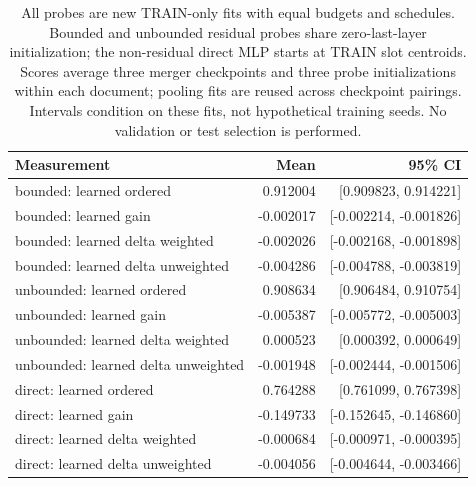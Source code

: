 \begin{table}[H]
\centering\small
\begin{tabularx}{\linewidth}{Yrr}
\toprule
Measurement & Mean & 95\% CI \\
\midrule
bounded: learned ordered & 0.912004 & [0.909823, 0.914221] \\
bounded: learned gain & -0.002017 & [-0.002214, -0.001826] \\
bounded: learned delta weighted & -0.002026 & [-0.002168, -0.001898] \\
bounded: learned delta unweighted & -0.004286 & [-0.004788, -0.003819] \\
unbounded: learned ordered & 0.908634 & [0.906484, 0.910754] \\
unbounded: learned gain & -0.005387 & [-0.005772, -0.005003] \\
unbounded: learned delta weighted & 0.000523 & [0.000392, 0.000649] \\
unbounded: learned delta unweighted & -0.001948 & [-0.002444, -0.001506] \\
direct: learned ordered & 0.764288 & [0.761099, 0.767398] \\
direct: learned gain & -0.149733 & [-0.152645, -0.146860] \\
direct: learned delta weighted & -0.000684 & [-0.000971, -0.000395] \\
direct: learned delta unweighted & -0.004056 & [-0.004644, -0.003466] \\
\bottomrule
\end{tabularx}
\caption{All probes are new TRAIN-only fits with equal budgets and schedules. Bounded and unbounded residual probes share zero-last-layer initialization; the non-residual direct MLP starts at TRAIN slot centroids. Scores average three merger checkpoints and three probe initializations within each document; pooling fits are reused across checkpoint pairings. Intervals condition on these fits, not hypothetical training seeds. No validation or test selection is performed.}
\label{tab:probe-families}
\end{table}
